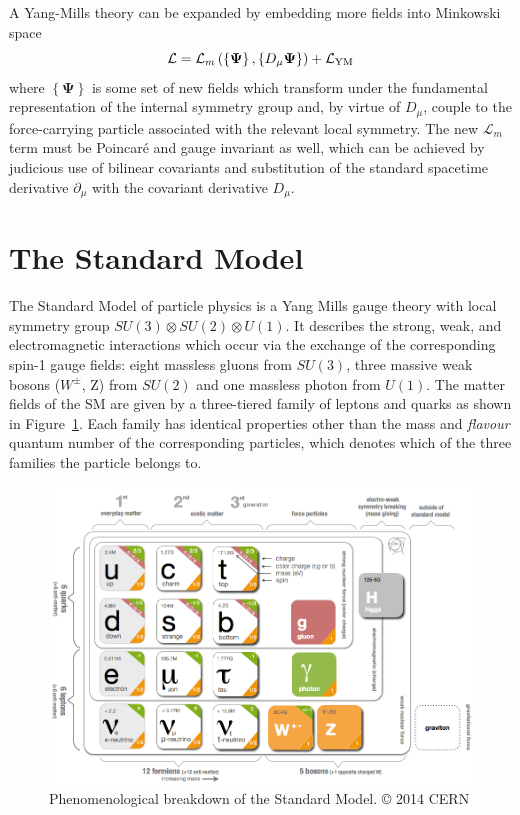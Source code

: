 A Yang-Mills theory can be expanded by embedding more fields into Minkowski space
\newcommand{\YM}{ \ensuremath{ \mathcal{L}_m\left( \left\{ \boldsymbol\Psi \right\}, \left\{ D_\mu \boldsymbol\Psi \right\} \right) }}
\begin{equation}
    \mathcal{L} = \YM + \YML
\end{equation}
where $\left\{ \boldsymbol\Psi \right\}$ is some set of new fields which transform under the fundamental representation of the internal symmetry group and, by virtue of $D_\mu$, couple to the force-carrying particle associated with the relevant local symmetry.
The new $\mathcal{L}_m$ term must be Poincar\'{e} and gauge invariant as well, which can be achieved by judicious use of bilinear covariants and substitution of the standard spacetime derivative $\partial_\mu$ with the covariant derivative $D_\mu$.

\section{The Standard Model}
The Standard Model of particle physics is a Yang Mills gauge theory with local symmetry group $SU(3) \otimes SU(2) \otimes U(1)$.
It describes the strong, weak, and electromagnetic interactions which occur via the exchange of the corresponding spin-1 gauge fields: eight massless gluons from $SU(3)$, three massive weak bosons ($W^\pm$, Z) from $SU(2)$ and one massless photon from $U(1)$.
The matter fields of the SM are given by a three-tiered family of leptons and quarks as shown in Figure~\ref{fig:sm_breakdown}.
Each family has identical properties other than the mass and \textit{flavour} quantum number of the corresponding particles, which denotes which of the three families the particle belongs to.

\begin{figure}[h]
   \centering
    \includegraphics[width=\textwidth]{SMdiagram}
    \caption{Phenomenological breakdown of the Standard Model. © 2014 CERN}
	\label{fig:sm_breakdown}
\end{figure}

